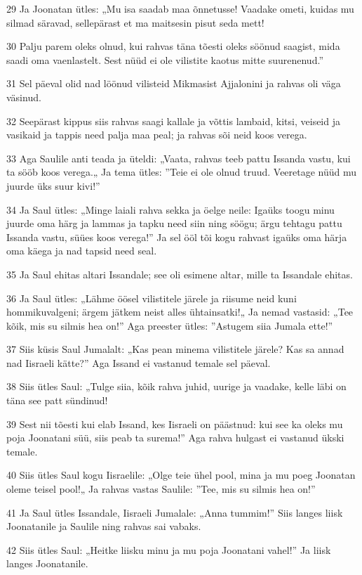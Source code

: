 \par 29 Ja Joonatan ütles: „Mu isa saadab maa õnnetusse! Vaadake ometi, kuidas mu silmad säravad, sellepärast et ma maitsesin pisut seda mett!
\par 30 Palju parem oleks olnud, kui rahvas täna tõesti oleks söönud saagist, mida saadi oma vaenlastelt. Sest nüüd ei ole vilistite kaotus mitte suurenenud.”
\par 31 Sel päeval olid nad löönud vilisteid Mikmasist Ajjalonini ja rahvas oli väga väsinud.
\par 32 Seepärast kippus siis rahvas saagi kallale ja võttis lambaid, kitsi, veiseid ja vasikaid ja tappis need palja maa peal; ja rahvas sõi neid koos verega.
\par 33 Aga Saulile anti teada ja üteldi: „Vaata, rahvas teeb pattu Issanda vastu, kui ta sööb koos verega.„ Ja tema ütles: ”Teie ei ole olnud truud. Veeretage nüüd mu juurde üks suur kivi!”
\par 34 Ja Saul ütles: „Minge laiali rahva sekka ja öelge neile: Igaüks toogu minu juurde oma härg ja lammas ja tapku need siin ning söögu; ärgu tehtagu pattu Issanda vastu, süües koos verega!” Ja sel ööl tõi kogu rahvast igaüks oma härja oma käega ja nad tapsid need seal.
\par 35 Ja Saul ehitas altari Issandale; see oli esimene altar, mille ta Issandale ehitas.
\par 36 Ja Saul ütles: „Lähme öösel vilistitele järele ja riisume neid kuni hommikuvalgeni; ärgem jätkem neist alles ühtainsatki!„ Ja nemad vastasid: „Tee kõik, mis su silmis hea on!” Aga preester ütles: ”Astugem siia Jumala ette!”
\par 37 Siis küsis Saul Jumalalt: „Kas pean minema vilistitele järele? Kas sa annad nad Iisraeli kätte?” Aga Issand ei vastanud temale sel päeval.
\par 38 Siis ütles Saul: „Tulge siia, kõik rahva juhid, uurige ja vaadake, kelle läbi on täna see patt sündinud!
\par 39 Sest nii tõesti kui elab Issand, kes Iisraeli on päästnud: kui see ka oleks mu poja Joonatani süü, siis peab ta surema!” Aga rahva hulgast ei vastanud ükski temale.
\par 40 Siis ütles Saul kogu Iisraelile: „Olge teie ühel pool, mina ja mu poeg Joonatan oleme teisel pool!„ Ja rahvas vastas Saulile: ”Tee, mis su silmis hea on!”
\par 41 Ja Saul ütles Issandale, Iisraeli Jumalale: „Anna tummim!” Siis langes liisk Joonatanile ja Saulile ning rahvas sai vabaks.
\par 42 Siis ütles Saul: „Heitke liisku minu ja mu poja Joonatani vahel!” Ja liisk langes Joonatanile.
